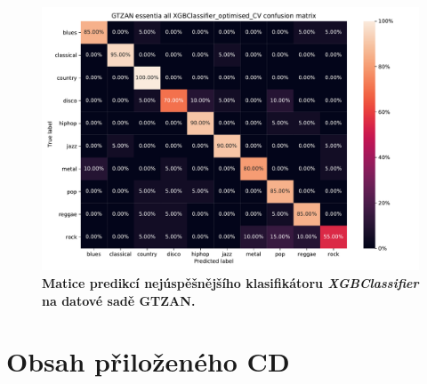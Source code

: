 \begin{figure}[h]
    \centering
    \includegraphics[width=\textwidth]{obrazky/GTZAN_essentia_all_XGBClassifier_optimised_CV_TS.pdf}
    \caption{\textbf{Matice predikcí nejúspěšnějšího klasifikátoru \textit{XGBClassifier} na datové sadě GTZAN.}}
    \label{obr_matice_predikce_GTZAN}
\end{figure}

\chapter{Obsah přiloženého CD}
\label{obsah_prilozeneho_cd}

